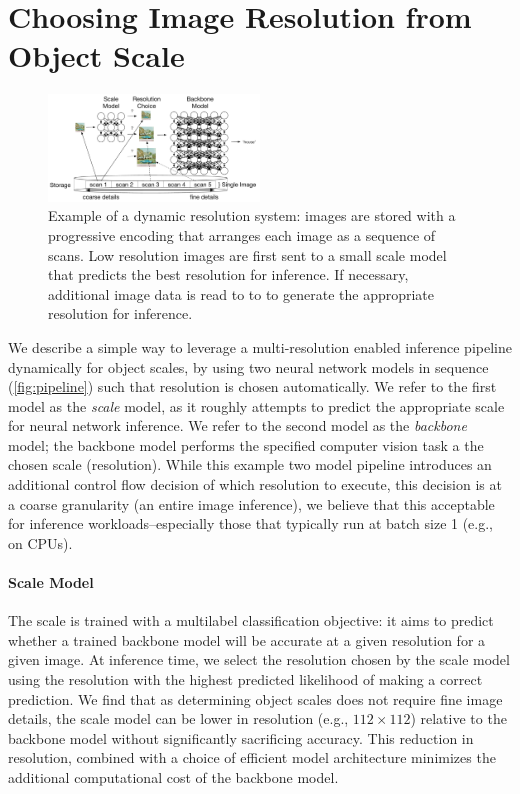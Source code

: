 \section{Choosing Image Resolution from Object Scale}
\begin{figure}
    \centering
    \includegraphics[width=0.5\textwidth]{e2e_diagrams/overview figure.pdf}
    \caption{Example of a dynamic resolution system: images are stored with a progressive encoding that arranges each image as a sequence of scans. Low resolution images are first sent to a small scale model that predicts the best resolution for inference. If necessary, additional image data is read to to to generate the appropriate resolution for inference. }
    \label{fig:pipeline}
\end{figure}
We describe a simple way to leverage a multi-resolution enabled inference pipeline dynamically for object scales, by using two neural network models in sequence (\autoref{fig:pipeline}) such that resolution is chosen automatically.
We refer to the first model as the \emph{scale} model, as it roughly attempts to predict the appropriate scale for neural network inference.
We refer to the second model as the \emph{backbone} model; the backbone model performs the specified computer vision task a the chosen scale (resolution).
While this example two model pipeline introduces an additional control flow decision of which resolution to execute, this decision is at a coarse granularity (an entire image inference), we believe that this acceptable for inference workloads--especially those that typically run at batch size 1 (e.g., on CPUs).

\paragraph{Scale Model}
The scale is trained with a multilabel classification objective: it aims to predict whether a trained backbone model will be accurate at a given resolution for a given image.
At inference time, we select the resolution chosen by the scale model using the resolution with the highest predicted likelihood of making a correct prediction.
We find that as determining object scales does not require fine image details, the scale model can be lower in resolution (e.g., $112\times112$) relative to the backbone model without significantly sacrificing accuracy.
This reduction in resolution, combined with a choice of efficient model architecture minimizes the additional computational cost of the backbone model.

